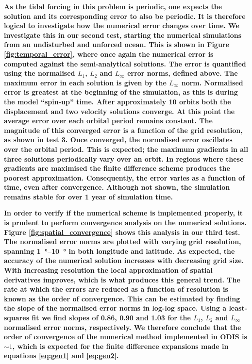 \textbf{As the tidal forcing in this problem is periodic, one expects the solution and its corresponding error to also be periodic. It is therefore logical to investigate how the numerical error changes over time. We investigate this in our second test, starting the numerical simulations from an undisturbed and unforced ocean. This is shown in Figure \ref{fig:temporal_error}, where once again the numerical error is computed against the \citet{matsuyama2014tidal} semi-analytical solutions. The error is quantified using the normalised $L_1$, $L_2$ and $L_{\infty}$ error norms, defined above. The maximum error in each solution is given by the $L_{\infty}$ norm. Normalised error is greatest at the beginning of the simulation, as this is during the model ``spin-up'' time. After approximately \num{10} orbits both the displacement and two velocity solutions converge. At this point the average error over each orbital period remains constant. The magnitude of this converged error is a function of the grid resolution, as shown in test 3. Once converged, the normalised error oscillates over the orbital period. This is expected; the maximum gradients in all three solutions periodically vary over an orbit. In regions where these gradients are maximised the finite difference scheme produces the poorest approximation. Consequently, the error varies as a function of time, even after convergence.  Although not shown, the simulation remains stable for over 1 year of simulation time. }

\textbf{In order to verify if the numerical scheme is implemented properly, it is prudent to perform convergence analysis on the numerical solutions. Figure \ref{fig:spatial_convergence} shows this analysis in our third test. The normalised error norms are plotted with varying grid resolution, spanning \SIrange{1}{10}{\degree} in both longitude and latitude. As expected, the accuracy of the numerical solution increases with decreasing grid size. With increasing resolution the local approximation of spatial derivatives improves, which is what produces this general trend. The rate at which the errors are reduced as a function of resolution is known as the order of convergence. This can be estimated by finding the slope of the normalised error norms in log-log space. Using a least-squares fit we find slopes of \num{0.86}, \num{0.90} and \num{1.03} for the $L_1$, $L_2$ and $L_{\infty}$ normalised error norms, respectively. We therefore conclude that the order of convergence of the numerical method implemented in ODIS is $\sim 1$, which is expected for the finite difference expansions made in equations \ref{eq:gen1} and \ref{eq:gen2}.}

